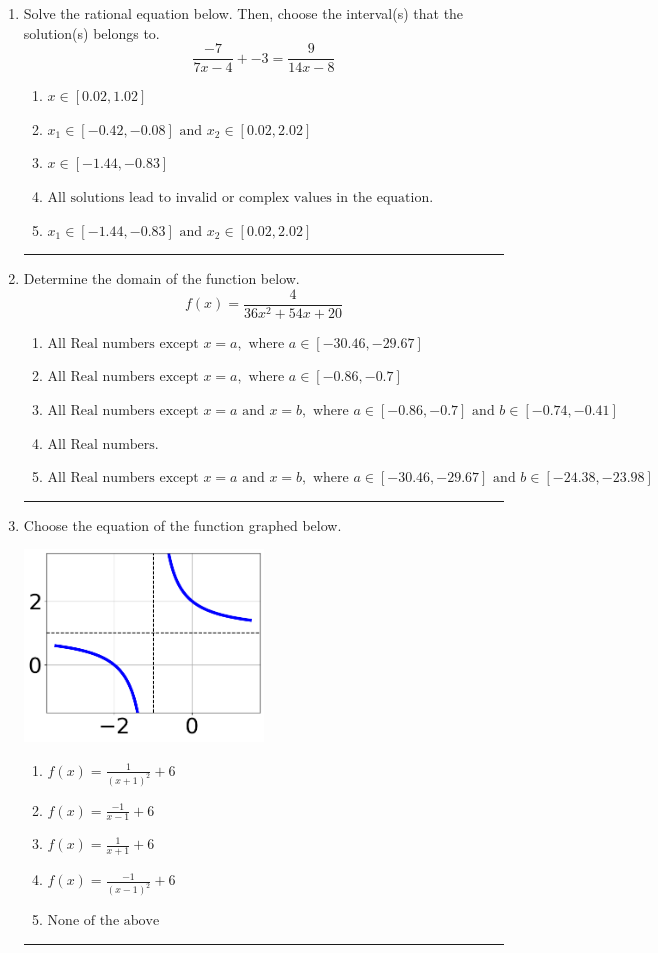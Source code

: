 \documentclass[14pt]{extbook}
\newcommand{\litem}[1]{\item#1\hspace*{-1cm}\rule{\textwidth}{0.4pt}}
\begin{document}
\begin{enumerate}
\litem{
Solve the rational equation below. Then, choose the interval(s) that the solution(s) belongs to.\[ \frac{-7}{7x -4} + -3 = \frac{9}{14x -8} \]\begin{enumerate}[label=\Alph*.]
\item \( x \in [0.02,1.02] \)
\item \( x_1 \in [-0.42, -0.08] \text{ and } x_2 \in [0.02,2.02] \)
\item \( x \in [-1.44,-0.83] \)
\item \( \text{All solutions lead to invalid or complex values in the equation.} \)
\item \( x_1 \in [-1.44, -0.83] \text{ and } x_2 \in [0.02,2.02] \)

\end{enumerate} }
\litem{
Determine the domain of the function below.\[ f(x) = \frac{4}{36x^{2} +54 x + 20} \]\begin{enumerate}[label=\Alph*.]
\item \( \text{All Real numbers except } x = a, \text{ where } a \in [-30.46, -29.67] \)
\item \( \text{All Real numbers except } x = a, \text{ where } a \in [-0.86, -0.7] \)
\item \( \text{All Real numbers except } x = a \text{ and } x = b, \text{ where } a \in [-0.86, -0.7] \text{ and } b \in [-0.74, -0.41] \)
\item \( \text{All Real numbers.} \)
\item \( \text{All Real numbers except } x = a \text{ and } x = b, \text{ where } a \in [-30.46, -29.67] \text{ and } b \in [-24.38, -23.98] \)

\end{enumerate} }
\litem{
Choose the equation of the function graphed below.
\begin{center}
    \includegraphics[width=0.5\textwidth]{../Figures/rationalGraphToEquationCopyB.png}
\end{center}
\begin{enumerate}[label=\Alph*.]
\item \( f(x) = \frac{1}{(x + 1)^2} + 6 \)
\item \( f(x) = \frac{-1}{x - 1} + 6 \)
\item \( f(x) = \frac{1}{x + 1} + 6 \)
\item \( f(x) = \frac{-1}{(x - 1)^2} + 6 \)
\item \( \text{None of the above} \)


\end{enumerate}}
\end{enumerate}
\end{document}
